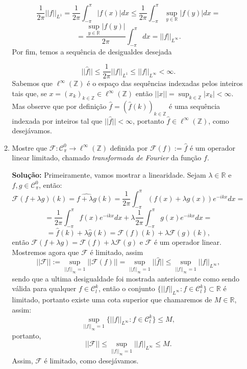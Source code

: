 \documentclass{article}
\begin{document}
\begin{enumerate}
\begin{enumerate}
			$$
			\frac{1}{2\pi}||f||_{L^{1}}= \frac{1}{2\pi} \int_{-\pi}^{\pi} |f(x)|dx \leq \frac{1}{2\pi} \int_{-\pi}^{\pi} \sup_{y \in \mathbb{R}}|f(y)|dx = 
			$$
			$$
			= \frac{\sup_{y \in \mathbb{R}}|f(y)|}{2\pi} \int_{-\pi}^{\pi} dx = ||f||_{L^{\infty}}.
			$$
			Por fim, temos a sequência de desigualdes desejada
			
			$$
			||\hat{f}|| \leq \frac{1}{2\pi}||f||_{L^{1}}\leq ||f||_{L^{\infty}} < \infty.
			$$
			Sabemos que $\ell^{\infty}(\mathbb{Z})$ é o espaço das sequências indexadas pelos inteiros tais que, se $x = (x_{k})_{k \in \mathbb{Z}} \in \ell^{\infty}(\mathbb{Z})$ então $||x|| = \sup_{k \in \mathbb{Z}}|x_{k}| < \infty$. Mas observe que por definição $\hat{f} = (\hat{f}(k))_{k \in \mathbb{Z}}$ é uma sequência indexada por inteiros tal que $||\hat{f}|| <\infty$, portanto $\hat{f} \in \ell^{\infty}(\mathbb{Z})$, como desejávamos.
			
			\item Mostre que $\mathcal{F}: \mathcal{C}^{0}_{\pi} \to \ell^{\infty}(\mathbb{Z})$ definida por $\mathcal{F}(f) := \hat{f}$ é um operador linear limitado, chamado \textit{transformada de Fourier} da função $f$.
			
			\textbf{Solução:} Primeiramente, vamos mostrar a linearidade. Sejam $\lambda \in \mathbb{R}$ e $f, g \in \mathcal{C}^{0}_{\pi}$, então:
			$$
			\mathcal{F}(f+\lambda g)(k) = \widehat{f+\lambda g}(k) =  \frac{1}{2\pi}\int_{-\pi}^{\pi} (f(x)+\lambda g(x))e^{-ikx}dx = 
			$$
			$$
			= \frac{1}{2\pi}\int_{-\pi}^{\pi} f(x)e^{-ikx}dx + \lambda \frac{1}{2\pi}\int_{-\pi}^{\pi} g(x)e^{-ikx}dx = 
			$$
			$$
			= \hat{f}(k) +\lambda \hat{g}(k) = \mathcal{F}(f)(k) + \lambda \mathcal{F}(g)(k),
			$$
			então $\mathcal{F}(f+\lambda g) = \mathcal{F}(f) + \lambda \mathcal{F}(g)$ e $\mathcal{F}$ é um operador linear. Mostremos agora que $\mathcal{F}$ é limitado, assim
			$$
			||\mathcal{F}|| := \sup_{||f||_{\infty}=1} ||\mathcal{F}(f)|| = \sup_{||f||_{\infty}=1} ||\hat{f}|| \leq \sup_{||f||_{\infty}=1} ||f||_{L^{\infty}},
			$$
			sendo que a ultima desigualdade foi mostrada anteriormente como sendo válida para qualquer $f \in \mathcal{C}^{k}_{l}$, então o conjunto $\{||f||_{L^{\infty}}: f \in \mathcal{C}^{k}_{l} \} \subset \mathbb{R} $ é limitado, portanto existe uma cota superior que chamaremos de $M \in \mathbb{R}$, assim:
			$$
			\sup\limits_{||f||_{\infty}=1} \{||f||_{L^{\infty}}: f \in \mathcal{C}^{k}_{l} \} \leq M,
			$$
			portanto,
			$$
			||\mathcal{F}|| \leq \sup_{||f||_{\infty}=1} ||f||_{L^{\infty}} \leq M.
			$$
			Assim, $\mathcal{F}$ é limitado, como desejávamos.
			
		\end{enumerate}
		
	\end{enumerate}
		
\end{document}
